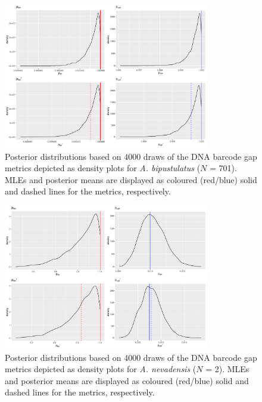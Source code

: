 \documentclass[12pt]{article}
\begin{document}
\newpage


\begin{figure}[H]

\centering

\includegraphics[width=0.80\textwidth]{Figure 5}

\caption{Posterior distributions based on 4000 draws of the DNA barcode gap metrics depicted as density plots for \textit{A. bipustulatus} ($N$ = 701). MLEs and posterior means are displayed as coloured (red/blue) solid and dashed lines for the metrics, respectively.}

\end{figure}

\newpage


\begin{figure}[H]

\centering

\includegraphics[width=0.80\textwidth]{Figure 6}

\caption{Posterior distributions based on 4000 draws of the DNA barcode gap metrics depicted as density plots for \textit{A. nevadensis} ($N$ = 2). MLEs and posterior means are displayed as coloured (red/blue) solid and dashed lines for the metrics, respectively.}

\end{figure}
\end{document}
